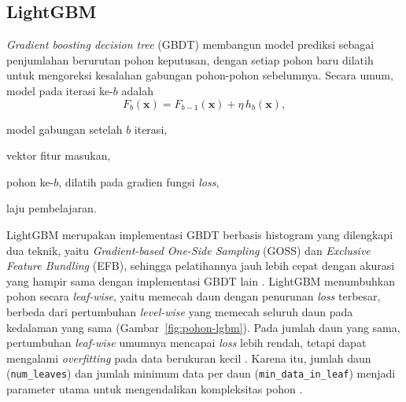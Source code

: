 \subsection{LightGBM}
\textit{Gradient boosting decision tree} (GBDT) membangun model prediksi
sebagai penjumlahan berurutan pohon keputusan, dengan setiap pohon baru dilatih
untuk mengoreksi kesalahan gabungan pohon-pohon sebelumnya. Secara umum, model
pada iterasi ke-$b$ adalah
\begin{equation}
  F_b(\mathbf{x}) = F_{b-1}(\mathbf{x}) + \eta\, h_b(\mathbf{x}),
  \label{eq:gbdt}
\end{equation}
\begin{keterangan}
  \item[$F_b(\mathbf{x})$] model gabungan setelah $b$ iterasi,
  \item[$\mathbf{x}$] vektor fitur masukan,
  \item[$h_b(\mathbf{x})$] pohon ke-$b$, dilatih pada gradien fungsi
    \textit{loss},
  \item[$\eta$] laju pembelajaran.
\end{keterangan}
LightGBM merupakan
implementasi GBDT berbasis histogram yang dilengkapi dua teknik, yaitu
\textit{Gradient-based One-Side Sampling} (GOSS) dan \textit{Exclusive Feature
Bundling} (EFB), sehingga pelatihannya jauh lebih cepat dengan akurasi yang
hampir sama dengan implementasi GBDT lain \cite{ke2017}. LightGBM menumbuhkan
pohon secara \textit{leaf-wise}, yaitu memecah daun dengan penurunan
\textit{loss} terbesar, berbeda dari pertumbuhan \textit{level-wise} yang
memecah seluruh daun pada kedalaman yang sama (Gambar~\ref{fig:pohon-lgbm}).
Pada jumlah daun yang sama, pertumbuhan \textit{leaf-wise} umumnya mencapai
\textit{loss} lebih rendah, tetapi dapat mengalami \textit{overfitting} pada
data berukuran kecil \cite{lightgbmfeatures}. Karena itu, jumlah daun
(\texttt{num\_leaves}) dan jumlah minimum data per daun
(\texttt{min\_data\_in\_leaf}) menjadi parameter utama untuk mengendalikan
kompleksitas pohon \cite{lightgbmtuning}.

